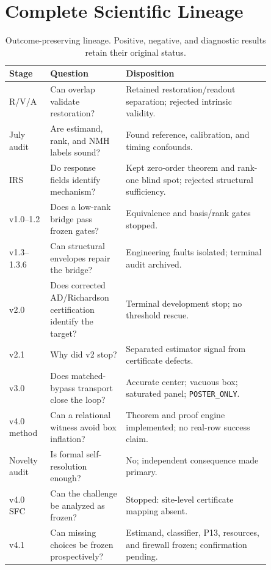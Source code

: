 \documentclass{article}
\begin{document}
\section{Complete Scientific Lineage}
\label{app:lineage}
\begin{table}[h]
\caption{Outcome-preserving lineage. Positive, negative, and diagnostic results retain their original status.}
\label{tab:lineage}
\centering\scriptsize
\begin{tabular}{p{0.12\linewidth}p{0.24\linewidth}p{0.49\linewidth}}
\toprule
\textbf{Stage} & \textbf{Question} & \textbf{Disposition} \\
\midrule
R/V/A & Can overlap validate restoration? & Retained restoration/readout separation; rejected intrinsic validity. \\
July audit & Are estimand, rank, and NMH labels sound? & Found reference, calibration, and timing confounds. \\
IRS & Do response fields identify mechanism? & Kept zero-order theorem and rank-one blind spot; rejected structural sufficiency. \\
v1.0--1.2 & Does a low-rank bridge pass frozen gates? & Equivalence and basis/rank gates stopped. \\
v1.3--1.3.6 & Can structural envelopes repair the bridge? & Engineering faults isolated; terminal audit archived. \\
v2.0 & Does corrected AD/Richardson certification identify the target? & Terminal development stop; no threshold rescue. \\
v2.1 & Why did v2 stop? & Separated estimator signal from certificate defects. \\
v3.0 & Does matched-bypass transport close the loop? & Accurate center; vacuous box; saturated panel; \texttt{POSTER\_ONLY}. \\
v4.0 method & Can a relational witness avoid box inflation? & Theorem and proof engine implemented; no real-row success claim. \\
Novelty audit & Is formal self-resolution enough? & No; independent consequence made primary. \\
v4.0 SFC & Can the challenge be analyzed as frozen? & Stopped: site-level certificate mapping absent. \\
v4.1 & Can missing choices be frozen prospectively? & Estimand, classifier, P13, resources, and firewall frozen; confirmation pending. \\
\bottomrule
\end{tabular}
\end{table}
\end{document}

